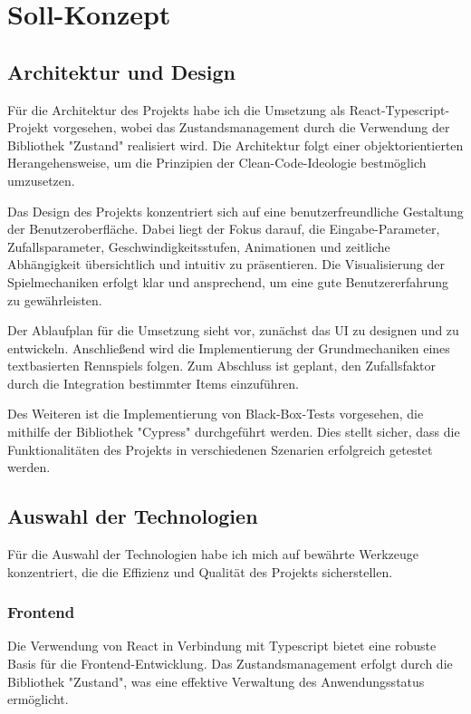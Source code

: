 \documentclass{article}
\begin{document}
\section{Soll-Konzept}

\subsection{Architektur und Design}
Für die Architektur des Projekts habe ich die Umsetzung als React-Typescript-Projekt vorgesehen, wobei das Zustandsmanagement durch die Verwendung der Bibliothek "Zustand" realisiert wird. Die Architektur folgt einer objektorientierten Herangehensweise, um die Prinzipien der Clean-Code-Ideologie bestmöglich umzusetzen.

Das Design des Projekts konzentriert sich auf eine benutzerfreundliche Gestaltung der Benutzeroberfläche. Dabei liegt der Fokus darauf, die Eingabe-Parameter, Zufallsparameter, Geschwindigkeitsstufen, Animationen und zeitliche Abhängigkeit übersichtlich und intuitiv zu präsentieren. Die Visualisierung der Spielmechaniken erfolgt klar und ansprechend, um eine gute Benutzererfahrung zu gewährleisten.

Der Ablaufplan für die Umsetzung sieht vor, zunächst das UI zu designen und zu entwickeln. Anschließend wird die Implementierung der Grundmechaniken eines textbasierten Rennspiels folgen. Zum Abschluss ist geplant, den Zufallsfaktor durch die Integration bestimmter Items einzuführen.

Des Weiteren ist die Implementierung von Black-Box-Tests vorgesehen, die mithilfe der Bibliothek "Cypress" durchgeführt werden. Dies stellt sicher, dass die Funktionalitäten des Projekts in verschiedenen Szenarien erfolgreich getestet werden.

\subsection{Auswahl der Technologien}
Für die Auswahl der Technologien habe ich mich auf bewährte Werkzeuge konzentriert, die die Effizienz und Qualität des Projekts sicherstellen.

\subsubsection{Frontend}
Die Verwendung von React in Verbindung mit Typescript bietet eine robuste Basis für die Frontend-Entwicklung. Das Zustandsmanagement erfolgt durch die Bibliothek "Zustand", was eine effektive Verwaltung des Anwendungsstatus ermöglicht.
\end{document}
